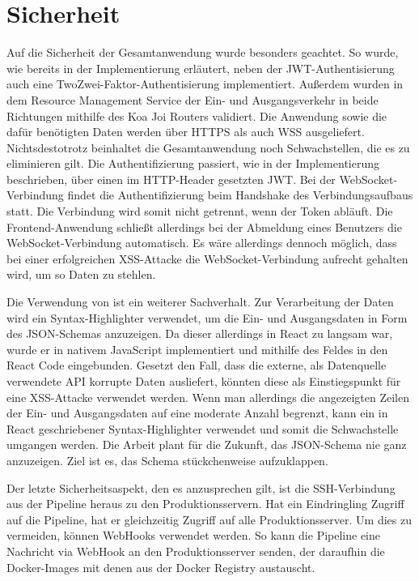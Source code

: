 \section{Sicherheit}
\label{sec:sicherheit}
Auf die Sicherheit der Gesamtanwendung wurde besonders geachtet. So
wurde, wie bereits in der Implementierung erläutert, neben
der JWT\hyp{}Authentisierung auch eine TwoZwei\hyp{}Faktor\hyp{}Authentisierung
implementiert. Außerdem wurden in dem Resource Management Service
der Ein- und Ausgangsverkehr in beide Richtungen mithilfe des Koa Joi Routers validiert. Die Anwendung sowie die dafür benötigten
Daten werden über HTTPS als auch WSS ausgeliefert. \mbox{Nichtsdestotrotz} beinhaltet die Gesamtanwendung
noch Schwachstellen, die es zu eliminieren gilt. Die Authentifizierung passiert, wie in der Implementierung beschrieben,
über einen im HTTP-Header gesetzten JWT. Bei der WebSocket-Verbindung findet die Authentifizierung beim Handshake des
Verbindungsaufbaus statt. Die Verbindung wird somit nicht getrennt, wenn der Token abläuft. Die Frontend-Anwendung
schließt allerdings bei der Abmeldung eines Benutzers die WebSocket-Verbindung automatisch. Es wäre allerdings dennoch möglich,
dass bei einer erfolgreichen XSS\hyp{}Attacke die WebSocket\hyp{}Verbindung aufrecht gehalten wird, um so Daten zu stehlen.

Die Verwendung von  ist ein weiterer Sachverhalt. Zur Verarbeitung
der Daten wird ein Syntax-Highlighter verwendet, um die Ein- und
Ausgangsdaten in Form des JSON-Schemas anzuzeigen.
Da dieser allerdings in React zu langsam war, wurde er
in nativem JavaScript implementiert und mithilfe des 
 Feldes in den React Code eingebunden. Gesetzt den Fall, dass die externe,
als Datenquelle verwendete API korrupte Daten ausliefert, könnten diese als Einstiegspunkt für eine XSS-Attacke verwendet werden.
Wenn man allerdings die angezeigten Zeilen der Ein- und Ausgangsdaten auf eine moderate Anzahl begrenzt, kann ein
in React geschriebener Syntax-Highlighter verwendet und somit die Schwachstelle umgangen werden. Die Arbeit plant
für die Zukunft, das JSON-Schema nie ganz anzuzeigen. Ziel ist es, das Schema stückchenweise aufzuklappen.

Der letzte Sicherheitsaspekt, den es anzusprechen gilt, ist die SSH-Verbindung aus der Pipeline heraus zu den Produktionsservern.
Hat ein Eindringling Zugriff auf die Pipeline, hat er gleichzeitig Zugriff auf alle Produktionsserver. 
Um dies zu vermeiden, können WebHooks verwendet werden. So kann die Pipeline eine Nachricht via WebHook an
den Produktionsserver senden, der daraufhin die Docker-Images mit denen aus der Docker Registry austauscht.

